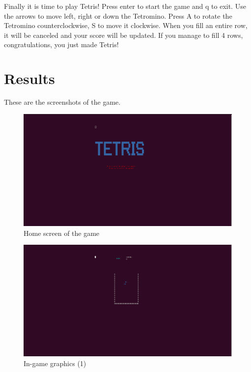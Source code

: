\documentclass{article}
\begin{document}
Finally it is time to play Tetris! Press enter to start the game and q to exit.
Use the arrows to move left, right or down the Tetromino. Press A to rotate the Tetromino counterclockwise, S to move it clockwise.
When you fill an entire row, it will be canceled and your score will be updated.\newline
If you manage to fill 4 rows, congratulations, you just made Tetris!\newpage

\section{Results}
These are the screenshots of the game.

\begin{figure}[H]
    \centering
    \includegraphics[width=\linewidth]{img/in_game/Tetris_home.png}
    \caption{Home screen of the game}
    \label{fig:home_screen}
\end{figure}

\begin{figure}[H]
    \centering
    \includegraphics[width=\linewidth]{img/in_game/Tetris_game_started.png}
    \caption{In-game graphics (1)}
    \label{fig:game_started}
\end{figure}
\end{document}
